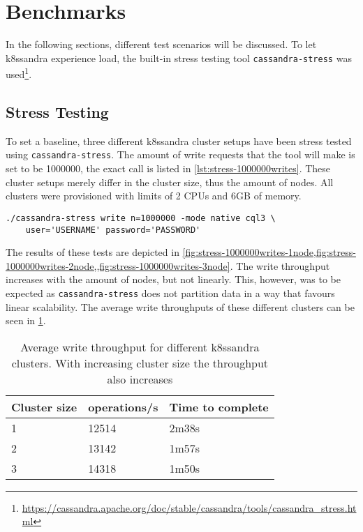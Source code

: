 \section{Benchmarks}

In the following sections, different test scenarios will be discussed. To let k8ssandra experience load, the built-in stress testing tool \texttt{cassandra-stress} was used\footnote{\raggedright\url{https://cassandra.apache.org/doc/stable/cassandra/tools/cassandra_stress.html}}.

\subsection{Stress Testing}
\label{sec:stress-testing}

To set a baseline, three different k8ssandra cluster setups have been stress tested using \texttt{cassandra-stress}. The amount of write requests that the tool will make is set to be 1000000, the exact call is listed in \cref{lst:stress-1000000writes}. These cluster setups merely differ in the cluster size, thus the amount of nodes. All clusters were provisioned with limits of 2 CPUs and 6GB of memory.

\begin{lstlisting}[caption={},
                    captionpos=b,
                    label=lst:stress-1000000writes,
                    float]
./cassandra-stress write n=1000000 -mode native cql3 \
    user='USERNAME' password='PASSWORD'
\end{lstlisting}

The results of these tests are depicted in \cref{fig:stress-1000000writes-1node,fig:stress-1000000writes-2node,,fig:stress-1000000writes-3node}. The write throughput increases with the amount of nodes, but not linearly. This, however, was to be expected as \texttt{cassandra-stress} does not partition data in a way that favours linear scalability. The average write throughputs of these different clusters can be seen in \cref{tab:stress-1000000writes-ops}.

\begin{table}[H]
\centering
\begin{tabular}{|l|l|l|}
\hline
\textbf{Cluster size} & \textbf{operations/s} & \textbf{Time to complete} \\ \hline
1                     & 12514                 & 2m38s                     \\ \hline
2                     & 13142                 & 1m57s                     \\ \hline
3                     & 14318                 & 1m50s                     \\ \hline
\end{tabular}
\caption{Average write throughput for different k8ssandra clusters. With increasing cluster size the throughput also increases}
\label{tab:stress-1000000writes-ops}
\end{table}

